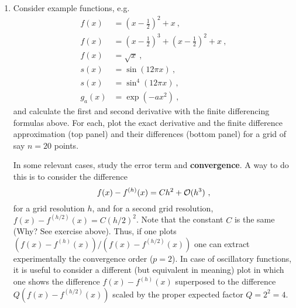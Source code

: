 \begin{enumerate}
    {\it Hint:} consider the Taylor expansions of the function at
    $x_i\pm h$.

    The formula above is called a second-order (because of the error
    term) finite-differencing
    approximation of the derivative with centered stencil (Note you
    use the same number of points arounf $x_i$).

    Similarly, show that an approximation
    of the second derivative at point $x_i$ is given by
    \begin{equation}
      \frac{d^2u}{dx^2}\approx \frac{u_{i+1}-2u_{i}+u_{i-1}}{h^2}
      + {\cal O}(h^2) \ ,  
    \end{equation}
    and compute the error term.
  \item Consider example functions, e.g.
    \begin{align}
      f(x) &= (x-\frac{1}{2})^2 + x   \ ,\\
      f(x) &= (x-\frac{1}{2})^3 + (x-\frac{1}{2})^2 + x   \ ,\\
      f(x) &= \sqrt{x}  \ ,\\
      s(x) &= \sin{(12\pi x)}  \ ,\\
      s(x) &= \sin^4{(12\pi x)}  \ ,\\
      g_a(x) &= \exp{(- a x^2)}  \ ,
    \end{align}
    and calculate the first and second derivative with the finite
    differencing formulas
    above. For each, plot the exact derivative and the finite
    difference approximation (top panel) and their differences (bottom
    panel) for a grid of say $n=20$ points.

    In some relevant cases, study the error term and
    {\bf convergence}. A way to do this is to consider the difference
    \begin{equation}
      f(x) - f^{(h)}(x)  = C h^2 + {\cal O}(h^3)\ ,
    \end{equation}
    for a grid resolution $h$, and for a
    second grid resolution, $f(x) - f^{(h/2)}(x)  = C (h/2)^2$. Note that
    the constant $C$ is the same (Why? See exercise above).
    Thus, if one plots $(f(x) - f^{(h)}(x))/(f(x) - f^{(h/2)}(x))$ one can
    extract experimentally the convergence order
    ($p=2$). In case of oscillatory functions, it is useful to
    consider a different (but equivalent in meaning) plot in which one shows the difference 
    $f(x) - f^{(h)}(x)$ superposed to the difference $Q(f(x) -
    f^{(h/2)}(x))$ scaled by the proper expected factor $Q=2^2=4$.


\end{enumerate}
